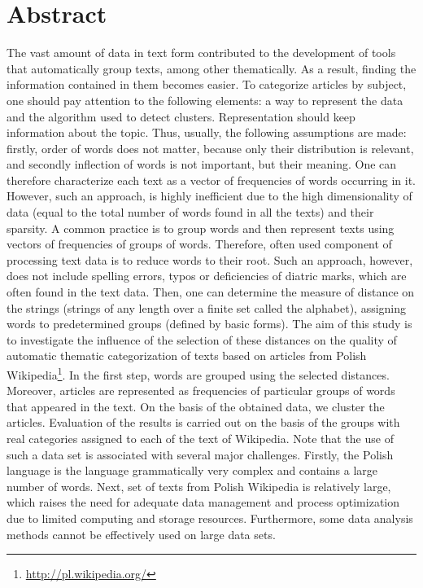 \documentclass{praca1}
\begin{document}
\newpage

\section*{Abstract}

The vast amount of data in text form contributed to the development of tools that automatically group texts, among other thematically. As a result, finding the information contained in them becomes easier. To categorize articles by subject, one should pay attention to the following elements: a way to represent the data and the algorithm used to detect clusters. Representation should keep information about the topic. Thus, usually, the following assumptions are made: firstly, order of words does not matter, because only their distribution is relevant, and secondly inflection of words is not important, but their meaning. One can therefore characterize each text as a vector of frequencies of words occurring in it. However, such an approach, is highly inefficient due to the high dimensionality of data (equal to the total number of words found in all the texts) and their sparsity. A common practice is to group words and then represent texts using vectors of frequencies of groups of words. Therefore, often used component of processing text data is to reduce words to their root. Such an approach, however, does not include spelling errors, typos or deficiencies of diatric marks, which are often found in the text data. Then, one can determine the measure of distance on the strings (strings of any length over a finite set called the alphabet), assigning words to predetermined groups (defined by basic forms). The aim of this study is to investigate the influence of the selection of these distances on the quality of automatic thematic categorization of texts based on articles from Polish Wikipedia\footnote{\url{http://pl.wikipedia.org/}}. In the first step, words are grouped using the selected distances. Moreover, articles are represented as frequencies of particular groups of words that appeared in the text. On the basis of the obtained data, we cluster the articles. Evaluation of the results is carried out on the basis of the groups with real categories assigned to each of the text of Wikipedia. Note that the use of such a data set is associated with several major challenges. Firstly, the Polish language is the language grammatically very complex and contains a large number of words. Next, set of texts from Polish Wikipedia is relatively large, which raises the need for adequate data management and process optimization due to limited computing and storage resources. Furthermore, some data analysis methods cannot be effectively used on large data sets.
\end{document}
